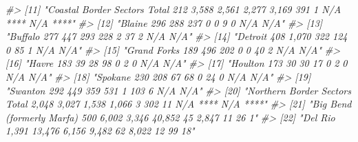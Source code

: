 \documentclass[
  12pt,
]{book}
\newenvironment{Shaded}{\begin{snugshade}}{\end{snugshade}}
\newcommand{\CommentTok}[1]{\textcolor[rgb]{0.37,0.37,0.37}{\textit{#1}}}
\begin{document}
\begin{Shaded}
\begin{Highlighting}[]
\CommentTok{\#\textgreater{} [11] "Coastal Border Sectors Total                      212               3,588                    2,561                   2,277            3,169             391               1        N/A **** N/A ****"}
\CommentTok{\#\textgreater{} [12] "Blaine                                            296                288                      237                       0                0                9               0           N/A     N/A"   }
\CommentTok{\#\textgreater{} [13] "Buffalo                                           277                447                      293                     228               2                37               2           N/A     N/A"   }
\CommentTok{\#\textgreater{} [14] "Detroit                                           408               1,070                     322                     124               0                85               1           N/A     N/A"   }
\CommentTok{\#\textgreater{} [15] "Grand Forks                                       189                496                      202                       0                0               40               2           N/A     N/A"   }
\CommentTok{\#\textgreater{} [16] "Havre                                             183                 39                       28                      98                0                2               0           N/A     N/A"   }
\CommentTok{\#\textgreater{} [17] "Houlton                                           173                 30                       30                      17                0                2               0           N/A     N/A"   }
\CommentTok{\#\textgreater{} [18] "Spokane                                           230                208                       67                      68                0               24               0           N/A     N/A"   }
\CommentTok{\#\textgreater{} [19] "Swanton                                           292                449                      359                     531                1              103               6           N/A     N/A"   }
\CommentTok{\#\textgreater{} [20] "Northern Border Sectors Total                    2,048              3,027                    1,538                   1,066               3              302              11        N/A **** N/A ****"}
\CommentTok{\#\textgreater{} [21] "Big Bend (formerly Marfa)                         500               6,002                   3,346                   40,852              45             2,847             11            26      1"    }
\CommentTok{\#\textgreater{} [22] "Del Rio                                          1,391             13,476                    6,156                   9,482              62             8,022             12            99     18"    }

\end{Highlighting}
\end{Shaded}
\end{document}
